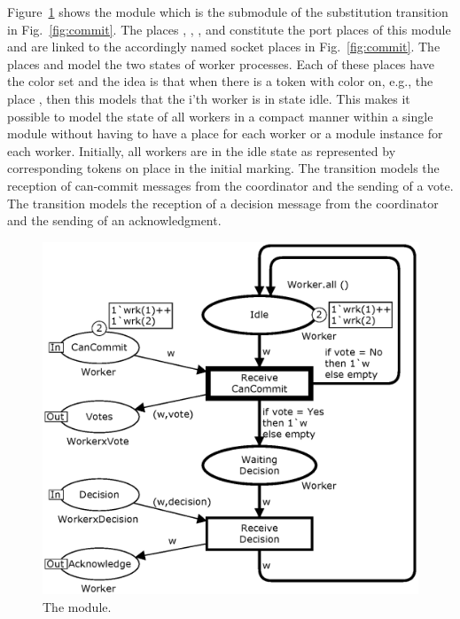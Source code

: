 Figure~\ref{fig:worker} shows the  module which is
the submodule of the  substitution transition in
Fig.~\ref{fig:commit}. The places ,
, , and 
constitute the port places of this module and are linked to the
accordingly named socket places in Fig.~\ref{fig:commit}. The places
 and  model the two states of
worker processes. Each of these places have the color set
 and the idea is that when there is a token with color
 on, e.g., the place , then this models
that the i'th worker is in state idle. This makes it possible to model
the state of all workers in a compact manner within a single module
without having to have a place for each worker or a module instance
for each worker. Initially, all workers are in the idle state as
represented by corresponding tokens on place  in the
initial marking. The transition  models the
reception of can-commit messages from the coordinator and the sending
of a vote. The transition  models the
reception of a decision message from the coordinator and the sending
of an acknowledgment.

\begin{figure}[]
\centering
\includegraphics[scale=.45]{figures/Workers.eps}
\caption{The  module.}
\label{fig:worker}
\end{figure}

